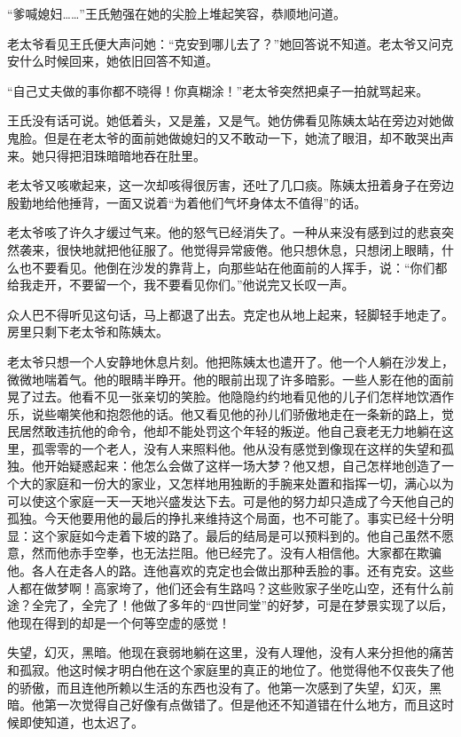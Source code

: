 \par “爹喊媳妇……”王氏勉强在她的尖脸上堆起笑容，恭顺地问道。
\par 老太爷看见王氏便大声问她：“克安到哪儿去了？”她回答说不知道。老太爷又问克安什么时候回来，她依旧回答不知道。
\par “自己丈夫做的事你都不晓得！你真糊涂！”老太爷突然把桌子一拍就骂起来。
\par 王氏没有话可说。她低着头，又是羞，又是气。她仿佛看见陈姨太站在旁边对她做鬼脸。但是在老太爷的面前她做媳妇的又不敢动一下，她流了眼泪，却不敢哭出声来。她只得把泪珠暗暗地吞在肚里。
\par 老太爷又咳嗽起来，这一次却咳得很厉害，还吐了几口痰。陈姨太扭着身子在旁边殷勤地给他捶背，一面又说着“为着他们气坏身体太不值得”的话。
\par 老太爷咳了许久才缓过气来。他的怒气已经消失了。一种从来没有感到过的悲哀突然袭来，很快地就把他征服了。他觉得异常疲倦。他只想休息，只想闭上眼睛，什么也不要看见。他倒在沙发的靠背上，向那些站在他面前的人挥手，说：“你们都给我走开，不要留一个，我不要看见你们。”他说完又长叹一声。
\par 众人巴不得听见这句话，马上都退了出去。克定也从地上起来，轻脚轻手地走了。房里只剩下老太爷和陈姨太。
\par 老太爷只想一个人安静地休息片刻。他把陈姨太也遣开了。他一个人躺在沙发上，微微地喘着气。他的眼睛半睁开。他的眼前出现了许多暗影。一些人影在他的面前晃了过去。他看不见一张亲切的笑脸。他隐隐约约地看见他的儿子们怎样地饮酒作乐，说些嘲笑他和抱怨他的话。他又看见他的孙儿们骄傲地走在一条新的路上，觉民居然敢违抗他的命令，他却不能处罚这个年轻的叛逆。他自己衰老无力地躺在这里，孤零零的一个老人，没有人来照料他。他从没有感觉到像现在这样的失望和孤独。他开始疑惑起来：他怎么会做了这样一场大梦？他又想，自己怎样地创造了一个大的家庭和一份大的家业，又怎样地用独断的手腕来处置和指挥一切，满心以为可以使这个家庭一天一天地兴盛发达下去。可是他的努力却只造成了今天他自己的孤独。今天他要用他的最后的挣扎来维持这个局面，也不可能了。事实已经十分明显：这个家庭如今走着下坡的路了。最后的结局是可以预料到的。他自己虽然不愿意，然而他赤手空拳，也无法拦阻。他已经完了。没有人相信他。大家都在欺骗他。各人在走各人的路。连他喜欢的克定也会做出那种丢脸的事。还有克安。这些人都在做梦啊！高家垮了，他们还会有生路吗？这些败家子坐吃山空，还有什么前途？全完了，全完了！他做了多年的“四世同堂”的好梦，可是在梦景实现了以后，他现在得到的却是一个何等空虚的感觉！
\par 失望，幻灭，黑暗。他现在衰弱地躺在这里，没有人理他，没有人来分担他的痛苦和孤寂。他这时候才明白他在这个家庭里的真正的地位了。他觉得他不仅丧失了他的骄傲，而且连他所赖以生活的东西也没有了。他第一次感到了失望，幻灭，黑暗。他第一次觉得自己好像有点做错了。但是他还不知道错在什么地方，而且这时候即使知道，也太迟了。
